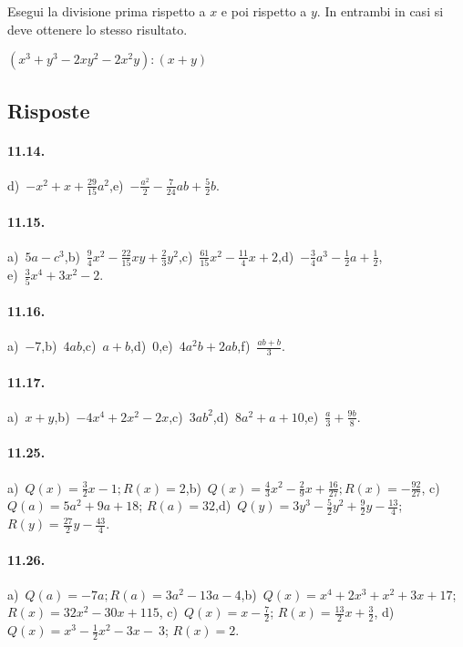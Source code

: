 \begin{esercizio}[\Ast]
\label{ese:11.65}
Esegui la divisione prima rispetto a $x$ e poi rispetto a $y$. In entrambi in casi si deve ottenere lo stesso risultato.

$\left(x^{3}+y^{3}-2xy^{2}-2x^{2}y\right):(x+y)$
\end{esercizio}

\subsection{Risposte}
\paragraph{11.14.} d)~$-x^{2}+x+\frac{29}{15}a^{2}$,\quad e)~$-{\frac{a^{2}}{2}}-\frac{7}{24}ab+\frac{5}{2}b$.
\paragraph{11.15.} a)~$5a-c^{3}$,\quad b)~$\frac{9}{4}x^{2}-\frac{22}{15}xy+\frac{2}{3}y^{2}$,\quad c)~$\frac{61}{15}x^{2}-\frac{11}{4}x+2$,\quad d)~$-\frac{3}{4}a^{3}-\frac{1}{2}a+\frac{1}{2}$,\protect\\ e)~$\frac{3}{5}x^{4}+3x^{2}-2$.
\paragraph{11.16.} a)~$-7$,\quad b)~$4ab$,\quad c)~$a+b$,\quad d)~$0$,\quad e)~$4a^{2}b+2ab$,\quad f)~$\frac{ab+b}{3}$.
\paragraph{11.17.} a)~$x+y$,\quad b)~$-4x^{4}+2x^{2}-2x$,\quad c)~$3ab^{2}$,\quad d)~$8a^{2}+a+10$,\quad e)~$\frac{a}{3}+\frac{9b}{8}$.
\paragraph{11.25.}
a)~$Q(x)=\frac{3}{2}x-1; R(x)=2$,\quad b)~$Q(x)=\frac{4}{3}x^{2}-\frac{2}{9}x+\frac{16}{27}; R(x)=-{\frac{92}{27}}$,\quad
c)~{$Q(a)=5a^{2}+9a+18$}; $R(a)=32$,\quad d)~$Q(y)=3y^{3}-\frac{5}{2}y^{2}+\frac{9}{2}y-\frac{13}{4}$; $R(y)=\frac{27}{2}y-\frac{43}{4}$.
\paragraph{11.26.}
a)~$Q(a)=-7a; R(a)=3a^{2}-13a-4$,\quad b)~$Q(x)=x^{4}+2x^{3}+x^{2}+3x+17$;\protect\\ ${R(x)=32x^{2}-30x+115}$,\quad
c)~$Q(x)=x-\frac{7}{2}$; $R(x)=\frac{13}{2}x+\frac{3}{2}$, d)~$Q(x)=x^{3}-\frac{1}{2}x^{2}-3x-~3$; $R(x)=2$.
